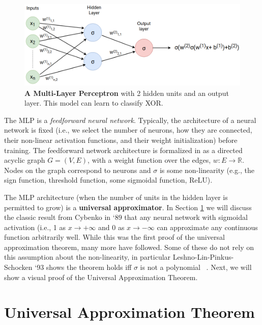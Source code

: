 \documentclass{article}
\begin{document}
\begin{figure}[H]
    \centering
    \includegraphics[width=.8\textwidth]{figures/nn.png}
    \caption{\textbf{A Multi-Layer Perceptron} with 2 hidden units and an output layer. This model can learn to classify XOR. }
    \label{fig:nn}
\end{figure}

The MLP is a \textit{feedforward neural network}. Typically, the architecture of a neural network is fixed (i.e., we select the number of neurons, how they are connected, their non-linear activation functions, and their weight initialization) before training. The feedforward network architecture is formalized in \citep{Shalev-Shwartz:2014:UML:2621980} as a directed acyclic graph $G = (V, E)$, with a weight function over the edges, $w: E \to \mathbb{R}$. Nodes on the graph correspond to neurons and $\sigma$ is some non-linearity (e.g., the sign function, threshold function, some sigmoidal function, ReLU).

\vspace{5mm}

The MLP architecture (when the number of units in the hidden layer is permitted to grow) is a \textbf{universal approximator}. In Section \ref{sec:uat} we will discuss the classic result from Cybenko in `89 \citep{cybenko1989approximation} that any neural network with sigmoidal activation (i.e., 1 as $x \to +\infty$ and 0 as $x \to -\infty$ can approximate any continuous function arbitrarily well. While this was the first proof of the universal approximation theorem, many more have followed. Some of these do not rely on this assumption about the non-linearity, in particular Leshno-Lin-Pinkus-Schocken `93 shows the theorem holds iff $\sigma$ is not a polynomial ~\citep{journals/nn/LeshnoLPS93}. Next, we will show a visual proof of the Universal Approximation Theorem.



\section{Universal Approximation Theorem}
\label{sec:uat}
\end{document}
